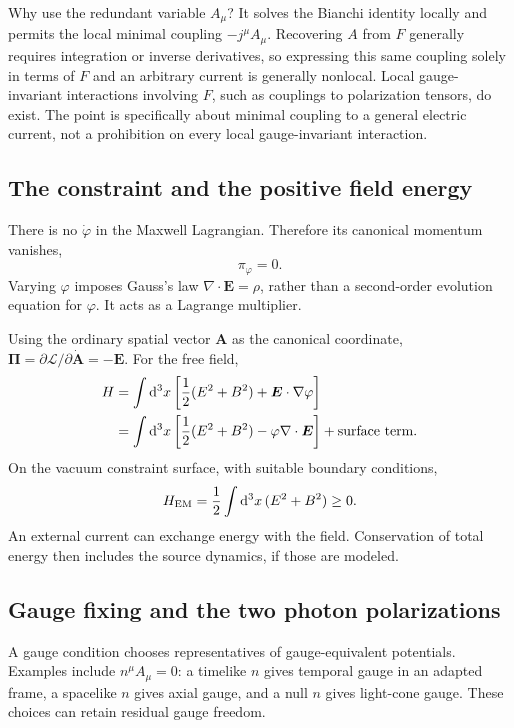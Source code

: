 \documentclass[11pt]{article}
\newcommand{\dd}{\mathrm{d}}
\newcommand{\Lag}{\mathcal{L}}
\begin{document}
Why use the redundant variable \(A_\mu\)? It solves the Bianchi identity
locally and permits the local minimal coupling \(-j^\mu A_\mu\). Recovering
\(A\) from \(F\) generally requires integration or inverse derivatives, so
expressing this same coupling solely in terms of \(F\) and an arbitrary
current is generally nonlocal. Local gauge-invariant interactions involving
\(F\), such as couplings to polarization tensors, do exist. The point is
specifically about minimal coupling to a general electric current, not a
prohibition on every local gauge-invariant interaction.

\subsection{The constraint and the positive field energy}

There is no \(\dot\varphi\) in the Maxwell Lagrangian. Therefore its
canonical momentum vanishes,
\begin{equation}
\pi_\varphi=0.
\end{equation}
Varying \(\varphi\) imposes Gauss's law
\(\nabla\cdot\bm E=\rho\), rather than a second-order evolution equation for
\(\varphi\). It acts as a Lagrange multiplier.

Using the ordinary spatial vector \(\bm A\) as the canonical coordinate,
\(\bm\Pi=\partial\Lag/\partial\dot{\bm A}=-\bm E\). For the free field,
\begin{align}
H&=\int\dd^3x\left[\frac12(E^2+B^2)+\bm E\cdot\nabla\varphi\right]
\notag\\
&=\int\dd^3x\left[\frac12(E^2+B^2)-\varphi\nabla\cdot\bm E\right]
+\text{surface term}.
\end{align}
On the vacuum constraint surface, with suitable boundary conditions,
\begin{equation}
H_{\rm EM}=\frac12\int\dd^3x\,(E^2+B^2)\geq0.
\end{equation}
An external current can exchange energy with the field. Conservation of
total energy then includes the source dynamics, if those are modeled.

\subsection{Gauge fixing and the two photon polarizations}

A gauge condition chooses representatives of gauge-equivalent potentials.
Examples include \(n^\mu A_\mu=0\): a timelike \(n\) gives temporal gauge in
an adapted frame, a spacelike \(n\) gives axial gauge, and a null \(n\) gives
light-cone gauge. These choices can retain residual gauge freedom.
\end{document}
